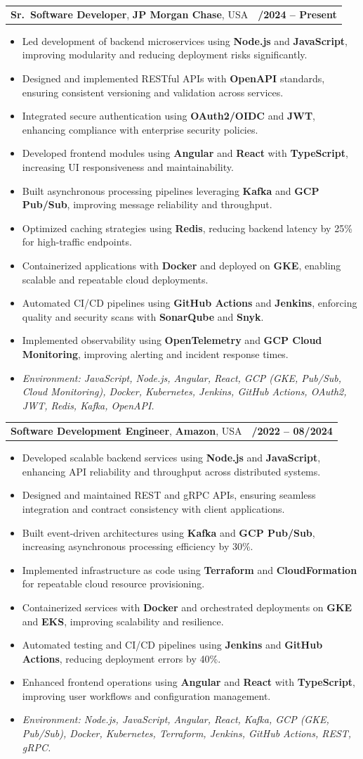 \documentclass[letterpaper,11pt]{article}
\makeatletter
\newcommand{\resumeItem}[1]{
  \item\footnotesize{
    {#1 \vspace{-2pt}}
  }
}
\newcommand{\resumeSubheading}[4]{
  \vspace{-2pt}\item
    \begin{tabular*}{1.0\textwidth}[t]{l@{\extracolsep{\fill}}r}
      \textbf{\fontsize{10pt}{14pt}\selectfont #3}, \textbf{\fontsize{10pt}{14pt}\selectfont #1}, \fontsize{10pt}{14pt}\selectfont #4 & \textbf{\fontsize{10pt}{14pt}\selectfont #2} \\
    \end{tabular*}\vspace{-7pt}
}
\newcommand{\resumeItemListStart}{\begin{itemize}[leftmargin=*]}
\newcommand{\resumeItemListEnd}{\end{itemize}\vspace{-5pt}}
\makeatother
\begin{document}
\resumeSubheading
{JP Morgan Chase}{09/2024 -- Present}
{Sr.\ Software Developer}{USA}
\resumeItemListStart
  \resumeItem{Led development of backend microservices using \textbf{Node.js} and \textbf{JavaScript}, improving modularity and reducing deployment risks significantly.}
  \resumeItem{Designed and implemented RESTful APIs with \textbf{OpenAPI} standards, ensuring consistent versioning and validation across services.}
  \resumeItem{Integrated secure authentication using \textbf{OAuth2/OIDC} and \textbf{JWT}, enhancing compliance with enterprise security policies.}
  \resumeItem{Developed frontend modules using \textbf{Angular} and \textbf{React} with \textbf{TypeScript}, increasing UI responsiveness and maintainability.}
  \resumeItem{Built asynchronous processing pipelines leveraging \textbf{Kafka} and \textbf{GCP Pub/Sub}, improving message reliability and throughput.}
  \resumeItem{Optimized caching strategies using \textbf{Redis}, reducing backend latency by 25\% for high-traffic endpoints.}
  \resumeItem{Containerized applications with \textbf{Docker} and deployed on \textbf{GKE}, enabling scalable and repeatable cloud deployments.}
  \resumeItem{Automated CI/CD pipelines using \textbf{GitHub Actions} and \textbf{Jenkins}, enforcing quality and security scans with \textbf{SonarQube} and \textbf{Snyk}.}
  \resumeItem{Implemented observability using \textbf{OpenTelemetry} and \textbf{GCP Cloud Monitoring}, improving alerting and incident response times.}
  \resumeItem{\textit{Environment: JavaScript, Node.js, Angular, React, GCP (GKE, Pub/Sub, Cloud Monitoring), Docker, Kubernetes, Jenkins, GitHub Actions, OAuth2, JWT, Redis, Kafka, OpenAPI.}}
\resumeItemListEnd

\resumeSubheading
{Amazon}{10/2022 -- 08/2024}
{Software Development Engineer}{USA}
\resumeItemListStart
  \resumeItem{Developed scalable backend services using \textbf{Node.js} and \textbf{JavaScript}, enhancing API reliability and throughput across distributed systems.}
  \resumeItem{Designed and maintained REST and gRPC APIs, ensuring seamless integration and contract consistency with client applications.}
  \resumeItem{Built event-driven architectures using \textbf{Kafka} and \textbf{GCP Pub/Sub}, increasing asynchronous processing efficiency by 30\%.}
  \resumeItem{Implemented infrastructure as code using \textbf{Terraform} and \textbf{CloudFormation} for repeatable cloud resource provisioning.}
  \resumeItem{Containerized services with \textbf{Docker} and orchestrated deployments on \textbf{GKE} and \textbf{EKS}, improving scalability and resilience.}
  \resumeItem{Automated testing and CI/CD pipelines using \textbf{Jenkins} and \textbf{GitHub Actions}, reducing deployment errors by 40\%.}
  \resumeItem{Enhanced frontend operations using \textbf{Angular} and \textbf{React} with \textbf{TypeScript}, improving user workflows and configuration management.}
  \resumeItem{\textit{Environment: Node.js, JavaScript, Angular, React, Kafka, GCP (GKE, Pub/Sub), Docker, Kubernetes, Terraform, Jenkins, GitHub Actions, REST, gRPC.}}
\resumeItemListEnd
\end{document}
